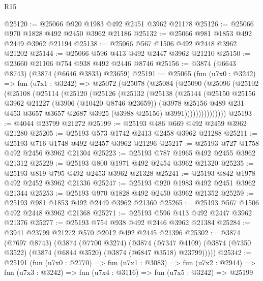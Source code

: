 \begin{lexlean}{R15}
\begin{coremodule}
@25120 := @25066 @920 @1983 @492 @2451 @3962 @21178
@25126 := @25066 @970 @1828 @492 @2450 @3962 @21186
@25132 := @25066 @981 @1853 @492 @2449 @3962 @21194
@25138 := @25066 @567 @1506 @492 @2448 @3962 @21202
@25144 := @25066 @596 @413 @492 @2447 @3962 @21210
@25150 := @23660 @21106 @754 @938 @492 @2446 @8746
@25156 := @3874 (@6643 @8743) (@3874 (@6646 @3833) @23659)
@25191 := @25065
    (fun (u7x0 : @3242) =>
    fun (u7x1 : @3242) =>
    @25072
      (@25078
        (@25084
          (@25090
            (@25096
              (@25102
                (@25108
                  (@25114
                    (@25120
                      (@25126
                        (@25132
                          (@25138
                            (@25144
                              (@25150
                                @25156
                                @3962
                                @21227
                                (@3906 (@10420 @8746 @23659))
                                (@3978
                                  @25156
                                  @489
                                  @231
                                  @453
                                  @3657
                                  @3657
                                  @2687
                                  @3925
                                  (@3988 @25156)
                                  @3991)))))))))))))))
@25193 := @4044 @23799 @21272
@25199 := @25193 @486 @669 @492 @2459 @3962 @21280
@25205 := @25193 @573 @1742 @2413 @2458 @3962 @21288
@25211 := @25193 @716 @1748 @492 @2457 @3962 @21296
@25217 := @25193 @727 @1758 @492 @2456 @3962 @21304
@25223 := @25193 @787 @1965 @492 @2455 @3962 @21312
@25229 := @25193 @800 @1971 @492 @2454 @3962 @21320
@25235 := @25193 @819 @795 @492 @2453 @3962 @21328
@25241 := @25193 @842 @1978 @492 @2452 @3962 @21336
@25247 := @25193 @920 @1983 @492 @2451 @3962 @21344
@25253 := @25193 @970 @1828 @492 @2450 @3962 @21352
@25259 := @25193 @981 @1853 @492 @2449 @3962 @21360
@25265 := @25193 @567 @1506 @492 @2448 @3962 @21368
@25271 := @25193 @596 @413 @492 @2447 @3962 @21376
@25277 := @25193 @754 @938 @492 @2446 @3962 @21384
@25284 := @3941 @23799 @21272 @570 @2012 @492 @2445 @21396
@25302 := @3874
    (@7697 @8743)
    (@3874
      (@7700 @3274)
      (@3874
        (@7347 @4109)
        (@3874 (@7350 @3522) (@3874 (@6844 @3520) (@3874 (@6847 @3518) @23799)))))
@25342 := @25191
    (fun (u7x0 : @2770) =>
    fun (u7x1 : @3083) =>
    fun (u7x2 : @2944) =>
    fun (u7x3 : @3242) =>
    fun (u7x4 : @3116) =>
    fun (u7x5 : @3242) =>
    @25199

\end{coremodule}
\end{lexlean}
